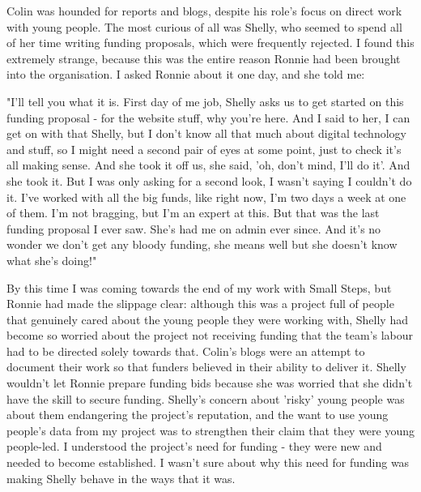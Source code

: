 Colin was hounded for reports and blogs, despite his role's focus on direct work with young people. The most curious of all was Shelly, who seemed to spend all of her time writing funding proposals, which were frequently rejected. I found this extremely strange, because this was the entire reason Ronnie had been brought into the organisation. I asked Ronnie about it one day, and she told me:

"I'll tell you what it is. First day of me job, Shelly asks us to get started on this funding proposal - for the website stuff, why you're here. And I said to her, I can get on with that Shelly, but I don't know all that much about digital technology and stuff, so I might need a second pair of eyes at some point, just to check it's all making sense. And she took it off us, she said, 'oh, don't mind, I'll do it'. And she took it. But I was only asking for a second look, I wasn't saying I couldn't do it. I've worked with all the big funds, like right now, I'm two days a week at one of them. I'm not bragging, but I'm an expert at this. But that was the last funding proposal I ever saw. She's had me on admin ever since. And it's no wonder we don't get any bloody funding, she means well but she doesn't know what she's doing!"

By this time I was coming towards the end of my work with Small Steps, but Ronnie had made the slippage clear: although this was a project full of people that genuinely cared about the young people they were working with, Shelly had become so worried about the project not receiving funding that the team's labour had to be directed solely towards that. Colin's blogs were an attempt to document their work so that funders believed in their ability to deliver it. Shelly wouldn't let Ronnie prepare funding bids because she was worried that she didn't have the skill to secure funding. Shelly's concern about 'risky' young people was about them endangering the project's reputation, and the want to use young people's data from my project was to strengthen their claim that they were young people-led. I understood the project's need for funding - they were new and needed to become established. I wasn't sure about why this need for funding was making Shelly behave in the ways that it was.

